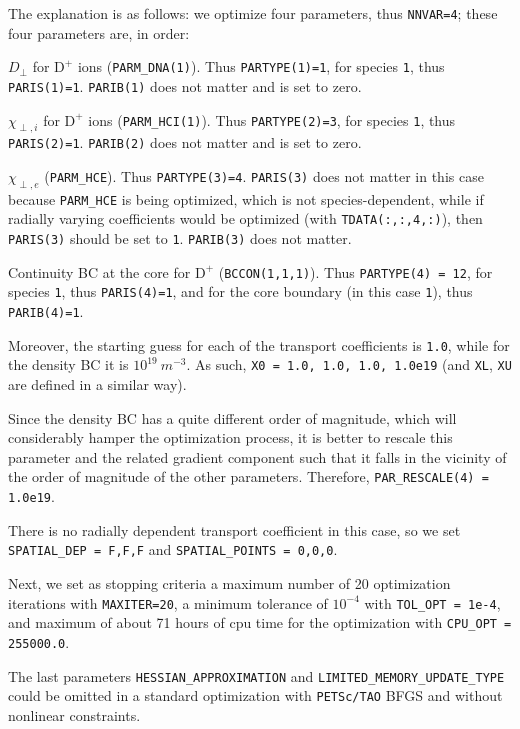 The explanation is as follows: we optimize four parameters, thus {\tt NNVAR=4}; these four parameters are, in order:
\begin{description}
  \item $D_{\perp}$ for $\mathrm{D}^{+}$ ions ({\tt PARM\_DNA(1)}). Thus {\tt PARTYPE(1)=1}, for species {\tt 1}, thus {\tt PARIS(1)=1}. {\tt PARIB(1)} does not matter and is set to zero.
  \item $\chi_{\perp,i}$ for $\mathrm{D}^{+}$ ions ({\tt PARM\_HCI(1)}). Thus {\tt PARTYPE(2)=3}, for species {\tt 1}, thus {\tt PARIS(2)=1}. {\tt PARIB(2)} does not matter and is set to zero.
  \item $\chi_{\perp,e}$ ({\tt PARM\_HCE}). Thus {\tt PARTYPE(3)=4}. {\tt PARIS(3)} does not matter in this case because {\tt PARM\_HCE} is being optimized, which is not species-dependent, while if radially varying coefficients would be optimized (with {\tt TDATA(:,:,4,:)}), then {\tt PARIS(3)} should be set to {\tt 1}. {\tt PARIB(3)} does not matter.
  \item Continuity BC at the core for $\mathrm{D}^{+}$ ({\tt BCCON(1,1,1)}). Thus {\tt PARTYPE(4) = 12}, for species {\tt 1}, thus {\tt PARIS(4)=1}, and for the core boundary (in this case {\tt 1}), thus {\tt PARIB(4)=1}.
\end{description}
Moreover, the starting guess for each of the transport coefficients is {\tt 1.0}, while for the density BC it is $10^{19}~m^{-3}$. As such, {\tt X0 = 1.0, 1.0, 1.0, 1.0e19} (and {\tt XL}, {\tt XU} are defined in a similar way).

Since the density BC has a quite different order of magnitude, which will considerably hamper the optimization process, it is better to rescale this parameter and the related gradient component such that it falls in the vicinity of the order of magnitude of the other parameters. Therefore, {\tt PAR\_RESCALE(4) = 1.0e19}.

\begin{sloppypar}
There is no radially dependent transport coefficient in this case, so we set {\tt SPATIAL\_DEP = F,F,F} and {\tt SPATIAL\_POINTS = 0,0,0}.
\end{sloppypar}

Next, we set as stopping criteria a maximum number of 20 optimization iterations with {\tt MAXITER=20}, a minimum tolerance of $10^{-4}$ with {\tt TOL\_OPT = 1e-4}, and maximum of about 71 hours of cpu time for the optimization with {\tt CPU\_OPT = 255000.0}.

The last parameters {\tt HESSIAN\_APPROXIMATION} and {\tt LIMITED\_MEMORY\_UPDATE\_TYPE} could be omitted in a standard optimization with {\tt PETSc/TAO} BFGS and without nonlinear constraints.


